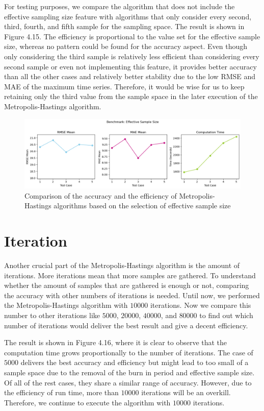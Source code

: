 For testing purposes, we compare the algorithm that does not include the effective sampling size feature with algorithms that only consider every second, third, fourth, and fifth sample for the sampling space. The result is shown in Figure 4.15. The efficiency is proportional to the value set for the effective sample size, whereas no pattern could be found for the accuracy aspect. Even though only considering the third sample is relatively less efficient than considering every second sample or even not implementing this feature, it provides better accuracy than all the other cases and relatively better stability due to the low RMSE and MAE of the maximum time series. Therefore, it would be wise for us to keep retaining only the third value from the sample space in the later execution of the Metropolis-Hastings algorithm.

\begin{figure}[H]
    \centering
    \includegraphics[width=1\textwidth]{figures/basic_mh/benchmark/effective_sample_size.png}
    \captionsetup{width=.8\textwidth}
    \caption{Comparison of the accuracy and the efficiency of Metropolis-Hastings algorithms based on the selection of effective sample size}
    \label{fig:enter-label}
\end{figure}


\section{Iteration}
Another crucial part of the Metropolis-Hastings algorithm is the amount of iterations. More iterations mean that more samples are gathered. To understand whether the amount of samples that are gathered is enough or not, comparing the accuracy with other numbers of iterations is needed. Until now, we performed the Metropolis-Hastings algorithm with $10000$ iterations. Now we compare this number to other iterations like $5000$, $20000$, $40000$, and $80000$ to find out which number of iterations would deliver the best result and give a decent efficiency.

The result is shown in Figure 4.16, where it is clear to observe that the computation time grows proportionally to the number of iterations. The case of $5000$ delivers the best accuracy and efficiency but might lead to too small of a sample space due to the removal of the burn in period and effective sample size. Of all of the rest cases, they share a similar range of accuracy. However, due to the efficiency of run time, more than $10000$ iterations will be an overkill. Therefore, we continue to execute the algorithm with $10000$ iterations. 

